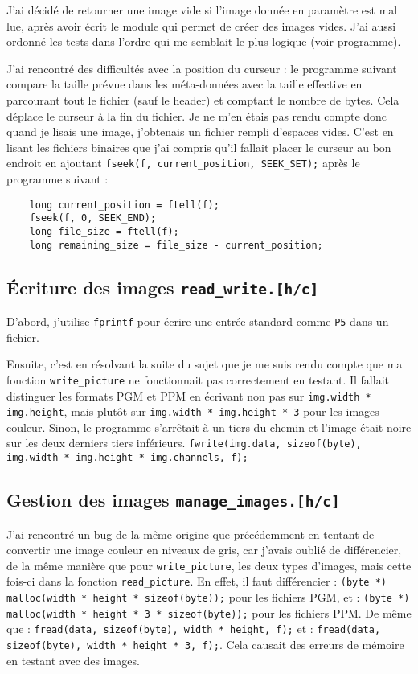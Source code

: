 \documentclass[a4paper,12pt]{article}
\begin{document}
J'ai décidé de retourner une image vide si l'image donnée en paramètre est mal lue, après avoir écrit le module qui permet de créer des images vides. J'ai aussi ordonné les tests dans l'ordre qui me semblait le plus logique (voir programme).

J'ai rencontré des difficultés avec la position du curseur : le programme suivant compare la taille prévue dans les méta-données avec la taille effective en parcourant tout le fichier (sauf le header) et comptant le nombre de bytes. Cela déplace le curseur à la fin du fichier. Je ne m'en étais pas rendu compte donc quand je lisais une image, j'obtenais un fichier rempli d'espaces vides. C'est en lisant les fichiers binaires que j'ai compris qu'il fallait placer le curseur au bon endroit en ajoutant \texttt{fseek(f, current\_position, SEEK\_SET);} après le programme suivant :
\begin{verbatim}
    long current_position = ftell(f);
    fseek(f, 0, SEEK_END);
    long file_size = ftell(f);
    long remaining_size = file_size - current_position;
\end{verbatim}

\subsection{Écriture des images \texttt{read\_write.[h/c]}}
D'abord, j'utilise \texttt{fprintf} pour écrire une entrée standard comme \texttt{P5} dans un fichier.

Ensuite, c'est en résolvant la suite du sujet que je me suis rendu compte que ma fonction \texttt{write\_picture} ne fonctionnait pas correctement en testant. Il fallait distinguer les formats PGM et PPM en écrivant non pas sur \texttt{img.width * img.height}, mais plutôt sur \texttt{img.width * img.height * 3} pour les images couleur. Sinon, le programme s'arrêtait à un tiers du chemin et l'image était noire sur les deux derniers tiers inférieurs.  
\texttt{fwrite(img.data, sizeof(byte), img.width * img.height * img.channels, f);}

\subsection{Gestion des images \texttt{manage\_images.[h/c]}}
J'ai rencontré un bug de la même origine que précédemment en tentant de convertir une image couleur en niveaux de gris, car j'avais oublié de différencier, de la même manière que pour \texttt{write\_picture}, les deux types d'images, mais cette fois-ci dans la fonction \texttt{read\_picture}. En effet, il faut différencier : \texttt{(byte *) malloc(width * height * sizeof(byte));}
pour les fichiers PGM, et : \texttt{(byte *) malloc(width * height * 3 * sizeof(byte));}
pour les fichiers PPM. De même que : \texttt{fread(data, sizeof(byte), width * height, f);}
et : \texttt{fread(data, sizeof(byte), width * height * 3, f);}. Cela causait des erreurs de mémoire en testant avec des images.  
\end{document}
